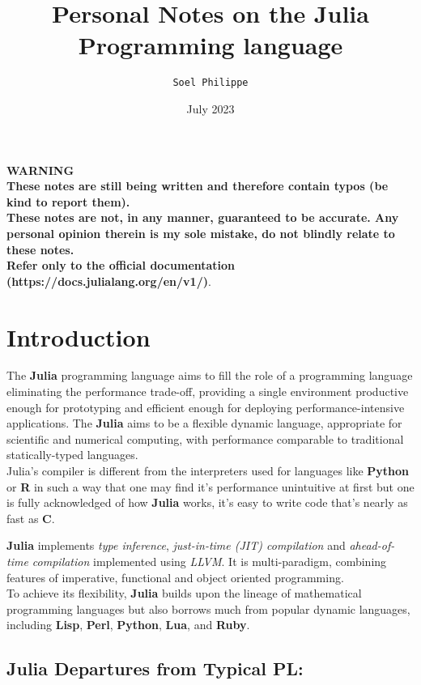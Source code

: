 \documentclass[
]{article}
\title{Personal Notes on the \textbf{Julia} Programming language}
\author{\texttt{Soel Philippe}}
\date{July 2023}
\begin{document}
\maketitle
\tableofcontents
\newpage
\begin{minipage}[c][7cm][t]{\textwidth}
\vspace*{\fill}
\centering
{\Huge \textbf{WARNING}}\\
\textbf{These notes are still being written and therefore contain typos (be kind to report them).\\
These notes are not, in any manner, guaranteed to be accurate. Any personal opinion therein is my
sole mistake, do not blindly relate to these notes.\\
Refer only to the official documentation (https://docs.julialang.org/en/v1/)}.
\vspace*{\fill}
\end{minipage}
\newpage
\hypertarget{introduction}{%
\section{Introduction}\label{introduction}}
The \textbf{Julia} programming language aims to fill the role of a
programming language eliminating the performance trade-off, providing a
single environment productive enough for prototyping and efficient
enough for deploying performance-intensive applications. The
\textbf{Julia} aims to be a flexible dynamic language, appropriate for
scientific and numerical computing, with performance comparable to
traditional statically-typed languages.\\
Julia's compiler is different from the interpreters used for languages
like \textbf{Python} or \textbf{R} in such a way that one may find it's
performance unintuitive at first but one is fully acknowledged of how
\textbf{Julia} works, it's easy to write code that's nearly as fast as
\textbf{C}.

\textbf{Julia} implements \emph{type inference}, \emph{just-in-time
(JIT) compilation} and \emph{ahead-of-time compilation} implemented
using \emph{LLVM}. It is multi-paradigm, combining features of
imperative, functional and object oriented programming.\\
To achieve its flexibility, \textbf{Julia} builds upon the lineage of
mathematical programming languages but also borrows much from popular
dynamic languages, including \textbf{Lisp}, \textbf{Perl},
\textbf{Python}, \textbf{Lua}, and \textbf{Ruby}.

\hypertarget{julia-departures-from-typical-pl}{%
\subsection{Julia Departures from Typical
PL:}\label{julia-departures-from-typical-pl}}
\end{document}
